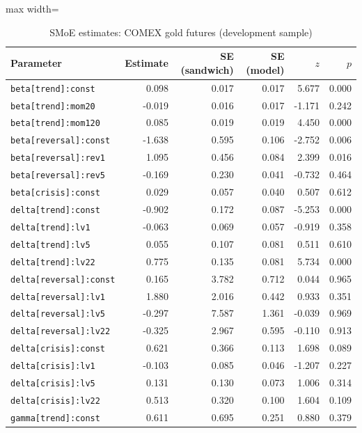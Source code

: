 \begin{table}[!htbp]\centering\scriptsize
\caption{SMoE estimates: COMEX gold futures (development sample)}\label{tab:params_gc_fut}
\begin{adjustbox}{max width=\textwidth}
\begin{tabular}{lrrrrr}
\toprule
Parameter & Estimate & SE (sandwich) & SE (model) & $z$ & $p$\\
\midrule
\texttt{beta[trend]:const} & 0.098 & 0.017 & 0.017 & 5.677 & 0.000\\
\texttt{beta[trend]:mom20} & -0.019 & 0.016 & 0.017 & -1.171 & 0.242\\
\texttt{beta[trend]:mom120} & 0.085 & 0.019 & 0.019 & 4.450 & 0.000\\
\texttt{beta[reversal]:const} & -1.638 & 0.595 & 0.106 & -2.752 & 0.006\\
\texttt{beta[reversal]:rev1} & 1.095 & 0.456 & 0.084 & 2.399 & 0.016\\
\texttt{beta[reversal]:rev5} & -0.169 & 0.230 & 0.041 & -0.732 & 0.464\\
\texttt{beta[crisis]:const} & 0.029 & 0.057 & 0.040 & 0.507 & 0.612\\
\texttt{delta[trend]:const} & -0.902 & 0.172 & 0.087 & -5.253 & 0.000\\
\texttt{delta[trend]:lv1} & -0.063 & 0.069 & 0.057 & -0.919 & 0.358\\
\texttt{delta[trend]:lv5} & 0.055 & 0.107 & 0.081 & 0.511 & 0.610\\
\texttt{delta[trend]:lv22} & 0.775 & 0.135 & 0.081 & 5.734 & 0.000\\
\texttt{delta[reversal]:const} & 0.165 & 3.782 & 0.712 & 0.044 & 0.965\\
\texttt{delta[reversal]:lv1} & 1.880 & 2.016 & 0.442 & 0.933 & 0.351\\
\texttt{delta[reversal]:lv5} & -0.297 & 7.587 & 1.361 & -0.039 & 0.969\\
\texttt{delta[reversal]:lv22} & -0.325 & 2.967 & 0.595 & -0.110 & 0.913\\
\texttt{delta[crisis]:const} & 0.621 & 0.366 & 0.113 & 1.698 & 0.089\\
\texttt{delta[crisis]:lv1} & -0.103 & 0.085 & 0.046 & -1.207 & 0.227\\
\texttt{delta[crisis]:lv5} & 0.131 & 0.130 & 0.073 & 1.006 & 0.314\\
\texttt{delta[crisis]:lv22} & 0.513 & 0.320 & 0.100 & 1.604 & 0.109\\
\texttt{gamma[trend]:const} & 0.611 & 0.695 & 0.251 & 0.880 & 0.379\\

\end{tabular}
\end{adjustbox}
\end{table}
